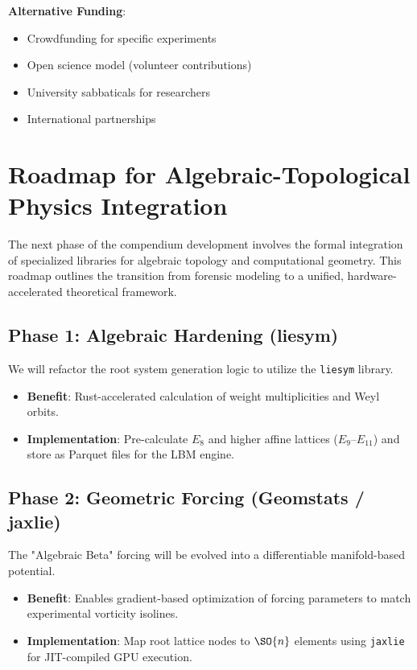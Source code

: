 \textbf{Alternative Funding}:
\begin{itemize}
    \item Crowdfunding for specific experiments
    \item Open science model (volunteer contributions)
    \item University sabbaticals for researchers
    \item International partnerships
\end{itemize}

\section{Roadmap for Algebraic-Topological Physics Integration}

The next phase of the compendium development involves the formal integration of specialized libraries for algebraic topology and computational geometry. This roadmap outlines the transition from forensic modeling to a unified, hardware-accelerated theoretical framework.

\subsection{Phase 1: Algebraic Hardening (liesym)}

We will refactor the root system generation logic to utilize the \texttt{liesym} library. 
\begin{itemize}
    \item \textbf{Benefit}: Rust-accelerated calculation of weight multiplicities and Weyl orbits.
    \item \textbf{Implementation}: Pre-calculate $E_8$ and higher affine lattices ($E_9$--$E_{11}$) and store as Parquet files for the LBM engine.
\end{itemize}

\subsection{Phase 2: Geometric Forcing (Geomstats / jaxlie)}

The "Algebraic Beta" forcing will be evolved into a differentiable manifold-based potential.
\begin{itemize}
    \item \textbf{Benefit}: Enables gradient-based optimization of forcing parameters to match experimental vorticity isolines.
    \item \textbf{Implementation}: Map root lattice nodes to $\SO{n}$ elements using \texttt{jaxlie} for JIT-compiled GPU execution.
\end{itemize}

